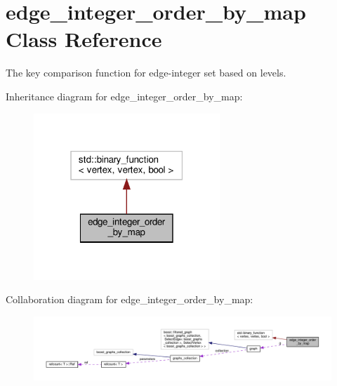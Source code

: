 \hypertarget{classedge__integer__order__by__map}{}\section{edge\+\_\+integer\+\_\+order\+\_\+by\+\_\+map Class Reference}
\label{classedge__integer__order__by__map}


The key comparison function for edge-\/integer set based on levels.  




Inheritance diagram for edge\+\_\+integer\+\_\+order\+\_\+by\+\_\+map\+:
\nopagebreak
\begin{figure}[H]
\begin{center}
\leavevmode
\includegraphics[width=199pt]{d0/deb/classedge__integer__order__by__map__inherit__graph}
\end{center}
\end{figure}


Collaboration diagram for edge\+\_\+integer\+\_\+order\+\_\+by\+\_\+map\+:
\nopagebreak
\begin{figure}[H]
\begin{center}
\leavevmode
\includegraphics[width=350pt]{d3/dde/classedge__integer__order__by__map__coll__graph}
\end{center}
\end{figure}
